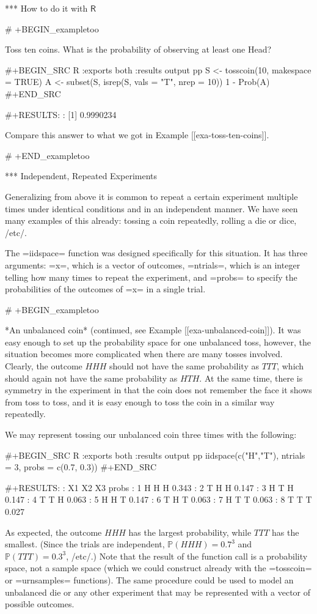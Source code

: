*** How to do it with \(\mathsf{R}\)

# +BEGIN_exampletoo

Toss ten coins. What is the probability of observing at least one
Head?

#+BEGIN_SRC R :exports both :results output pp  
S <- tosscoin(10, makespace = TRUE)
A <- subset(S, isrep(S, vals = "T", nrep = 10))
1 - Prob(A)
#+END_SRC

#+RESULTS:
: [1] 0.9990234

Compare this answer to what we got in Example [[exa-toss-ten-coins]].

# +END_exampletoo

*** Independent, Repeated Experiments

Generalizing from above it is common to repeat a certain experiment
multiple times under identical conditions and in an independent
manner. We have seen many examples of this already: tossing a coin
repeatedly, rolling a die or dice, /etc/.

The =iidspace= function was designed specifically for this
situation. It has three arguments: =x=, which is a vector of outcomes,
=ntrials=, which is an integer telling how many times to repeat the
experiment, and =probs= to specify the probabilities of the outcomes
of =x= in a single trial.

# +BEGIN_exampletoo

*An unbalanced coin* (continued, see Example [[exa-unbalanced-coin]]). It was
easy enough to set up the probability space for one unbalanced toss,
however, the situation becomes more complicated when there are many
tosses involved. Clearly, the outcome \(HHH\) should not have the same
probability as \(TTT\), which should again not have the same
probability as \(HTH\). At the same time, there is symmetry in the
experiment in that the coin does not remember the face it shows from
toss to toss, and it is easy enough to toss the coin in a similar way
repeatedly.

We may represent tossing our unbalanced coin three times with the following: 

#+BEGIN_SRC R :exports both :results output pp  
iidspace(c("H","T"), ntrials = 3, probs = c(0.7, 0.3)) 
#+END_SRC 

#+RESULTS:
:   X1 X2 X3 probs
: 1  H  H  H 0.343
: 2  T  H  H 0.147
: 3  H  T  H 0.147
: 4  T  T  H 0.063
: 5  H  H  T 0.147
: 6  T  H  T 0.063
: 7  H  T  T 0.063
: 8  T  T  T 0.027

As expected, the outcome \(HHH\) has the largest probability, while
\(TTT\) has the smallest. (Since the trials are independent,
\(\mathbb{P}(HHH)=0.7^{3}\) and \(\mathbb{P}(TTT)=0.3^{3}\), /etc/.)
Note that the result of the function call is a probability space, not
a sample space (which we could construct already with the =tosscoin=
or =urnsamples= functions). The same procedure could be used to model
an unbalanced die or any other experiment that may be represented with
a vector of possible outcomes.

